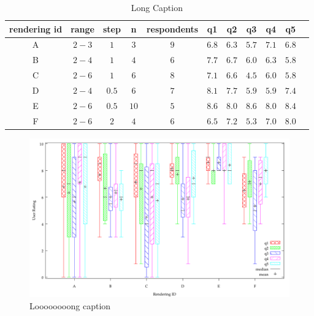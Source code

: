 \begin{table}
  \footnotesize
  \myfloatalign
  \begin{tabular}{ccccccccccc}
    \toprule
    rendering id & range & step & n & respondents & q1 & q2 & q3 & q4 & q5 \\
    \midrule
    A & $2-3$ & $1$   & $3$  & $9$ & $6.8$ & $6.3$ & $5.7$ & $7.1$ & $6.8$ \\
    B & $2-4$ & $1$   & $4$  & $6$ & $7.7$ & $6.7$ & $6.0$ & $6.3$ & $5.8$ \\
    C & $2-6$ & $1$   & $6$  & $8$ & $7.1$ & $6.6$ & $4.5$ & $6.0$ & $5.8$ \\
    D & $2-4$ & $0.5$ & $6$  & $7$ & $8.1$ & $7.7$ & $5.9$ & $5.9$ & $7.4$ \\
    E & $2-6$ & $0.5$ & $10$ & $5$ & $8.6$ & $8.0$ & $8.6$ & $8.0$ & $8.4$ \\
    F & $2-6$ & $2$   & $4$  & $6$ & $6.5$ & $7.2$ & $5.3$ & $7.0$ & $8.0$ \\
    \bottomrule
\end{tabular}
  \caption[Short Caption]{Long Caption}
  \label{tab:studyavgs}
\end{table}

\begin{figure}
  \begin{center}
  \includegraphics[height=0.5\textheight]{gnuplot/survey.pdf}
  \end{center}
  \caption[Short Caption]{Loooooooong caption}
  \label{fig:survey}
\end{figure}





